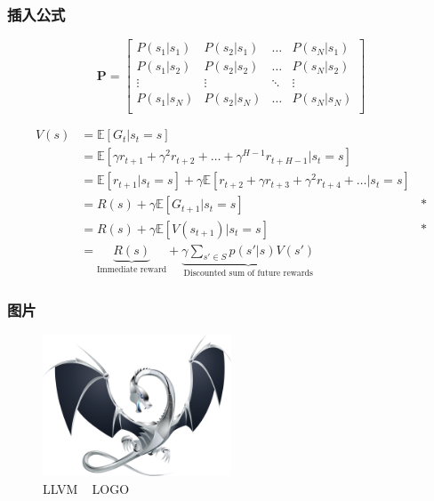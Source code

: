 \documentclass[11pt]{ctexart}
\begin{document}
\subsubsection{插入公式}

\[
\mathbf{P}=
\begin{bmatrix}
	P(s_1|s_1) & P(s_2|s_1) & \ldots & P(s_N|s_1)\\
	P(s_1|s_2) & P(s_2|s_2) & \ldots & P(s_N|s_2)\\
	\vdots & \vdots & \ddots & \vdots\\
	P(s_1|s_N) & P(s_2|s_N) & \ldots & P(s_N|s_N)\\
\end{bmatrix}
\]




\begin{align*}
	V(s) & = \mathbb{E}[G_t|s_t=s] \\
	& = \mathbb{E}[\gamma r_{t+1} + \gamma^{2} r_{t+2} + \ldots + 		\gamma^{H-1} r_{t+H-1}|s_t=s]\\
	& = \mathbb{E}[r_{t+1}|s_t = s] + \gamma\mathbb{E}[r_{t+2}+\gamma r_{t+3}+\gamma^2 r_{t+4}+ \ldots | s_t = s]\\
	& = R(s) + \gamma\mathbb{E}[G_{t+1}|s_t = s] ~~~ &*\\
	& = R(s) + \gamma\mathbb{E}[V(s_{t+1})|s_t = s]  ~~~ &*\\
	& = \underbrace{R(s)}_\text{Immediate reward} + \underbrace{ \gamma\sum_{s' \in S}p(s' | s)V(s')}_\text{Discounted sum of future rewards}
\end{align*}

\newpage
\subsubsection{图片}

\begin{figure}[h]
	\centering
	\includegraphics[width=0.5\textwidth]{images/LLVM.png}
	\caption{LLVM ~ LOGO}
	\label{fig:logo}
\end{figure}
\end{document}
